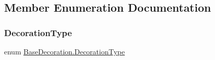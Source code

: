 \subsection{Member Enumeration Documentation}
\mbox{\label{class_base_decoration_a8adb8095439bd24fd3c2058b2ecbbf11}} 
\subsubsection{\texorpdfstring{DecorationType}{DecorationType}}
{\footnotesize\ttfamily enum \mbox{\hyperlink{class_base_decoration_a8adb8095439bd24fd3c2058b2ecbbf11}{Base\+Decoration.\+Decoration\+Type}}\hspace{0.3cm}{\ttfamily [strong]}}

